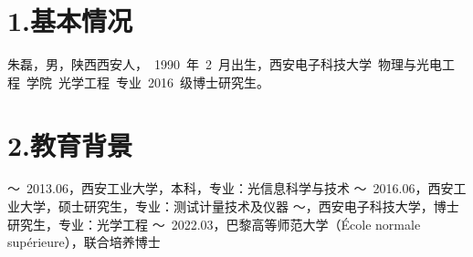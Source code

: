 
\begin{resume}

\section*{1.\hspace{0.75em}基本情况}
朱磊，男，陕西西安人，~1990~年~2~月出生，西安电子科技大学~物理与光电工程~学院~光学工程~专业~2016~级博士研究生。
\section*{2.\hspace{0.75em}教育背景}
\begin{resumelist*}
～~2013.06，西安工业大学，本科，专业：光信息科学与技术
～~2016.06，西安工业大学，硕士研究生，专业：测试计量技术及仪器
～\hspace{3.5em}，西安电子科技大学，博士研究生，专业：光学工程
～~2022.03，巴黎高等师范大学（École normale supérieure），联合培养博士
\end{resumelist*}


\end{resume}
